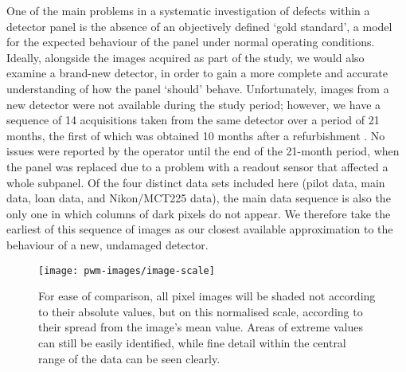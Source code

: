\documentclass[\main/IO-Pixels.tex]{subfiles}
\begin{document}
One of the main problems in a systematic investigation of defects within a detector panel is the absence of an objectively defined `gold standard', a model for the expected behaviour of the panel under normal operating conditions. Ideally, alongside the images acquired as part of the study, we would also examine a brand-new detector, in order to gain a more complete and accurate understanding of how the panel `should' behave. Unfortunately, images from a new detector were not available during the study period; however, we have a sequence of 14 acquisitions taken from the same detector over a period of 21 months, the first of which was obtained 10 months after a refurbishment . No issues were reported by the operator until the end of the 21-month period, when the panel was replaced due to a problem with a readout sensor that affected a whole subpanel. Of the four distinct data sets included here (pilot data, main data, loan data, and Nikon/MCT225 data), the main data sequence is also the only one in which columns of dark pixels do not appear. We therefore take the earliest of this sequence of images as our closest available approximation to the behaviour of a new, undamaged detector.


\begin{figure}
\caption{For ease of comparison, all pixel images will be shaded not according to their absolute values, but on this normalised scale, according to their spread from the image's mean value. Areas of extreme values can still be easily identified, while fine detail within the central range of the data can be seen clearly.}

\centering
    \texttt{[image: pwm-images/image-scale]}

\end{figure}


\end{document}
